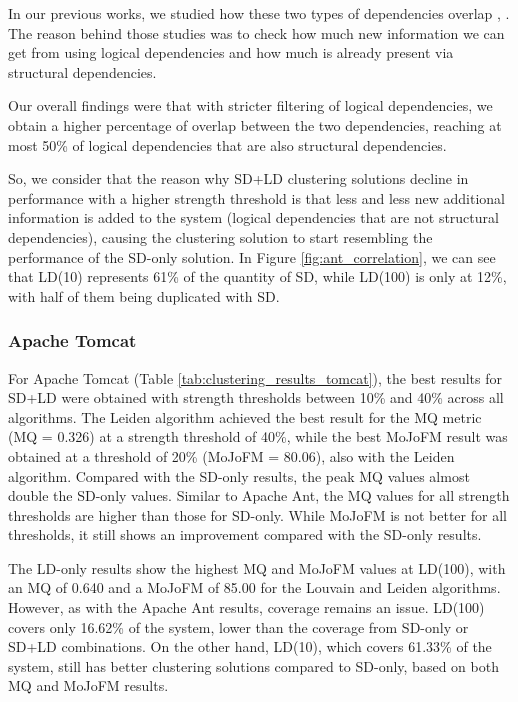 \documentclass{ieeeaccess}
\begin{document}
In our previous works, we studied how these two types of dependencies overlap \cite{b4}, \cite{b5}. The reason behind those studies was to check how much new information we can get from using logical dependencies and how much is already present via structural dependencies.

Our overall findings were that with stricter filtering of logical dependencies, we obtain a higher percentage of overlap between the two dependencies, reaching at most 50\% of logical dependencies that are also structural dependencies.

So, we consider that the reason why SD+LD clustering solutions decline in performance with a higher strength threshold is that less and less new additional information is added to the system (logical dependencies that are not structural dependencies), causing the clustering solution to start resembling the performance of the SD-only solution. In Figure \ref{fig:ant_correlation}, we can see that LD(10) represents 61\% of the quantity of SD, while LD(100) is only at 12\%, with half of them being duplicated with SD.


\subsubsection{Apache Tomcat}

For Apache Tomcat (Table \ref{tab:clustering_results_tomcat}), the best results for SD+LD were obtained with strength thresholds between 10\% and 40\% across all algorithms. The Leiden algorithm achieved the best result for the MQ metric (MQ = 0.326) at a strength threshold of 40\%, while the best MoJoFM result was obtained at a threshold of 20\% (MoJoFM = 80.06), also with the Leiden algorithm. Compared with the SD-only results, the peak MQ values almost double the SD-only values. Similar to Apache Ant, the MQ values for all strength thresholds are higher than those for SD-only. While MoJoFM is not better for all thresholds, it still shows an improvement compared with the SD-only results.

The LD-only results show the highest MQ and MoJoFM values at LD(100), with an MQ of 0.640 and a MoJoFM of 85.00 for the Louvain and Leiden algorithms. However, as with the Apache Ant results, coverage remains an issue. LD(100) covers only 16.62\% of the system, lower than the coverage from SD-only or SD+LD combinations. On the other hand, LD(10), which covers 61.33\% of the system, still has better clustering solutions compared to SD-only, based on both MQ and MoJoFM results. 
\end{document}
